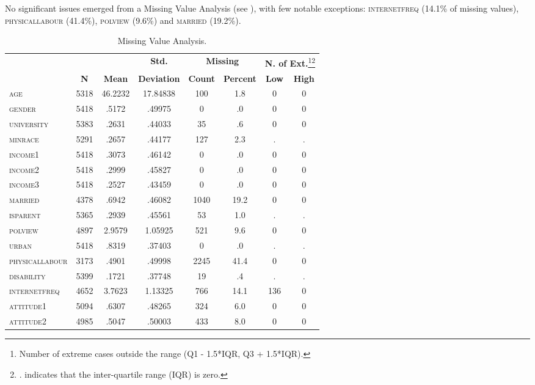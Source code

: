 No significant issues emerged from a Missing Value Analysis (see ),
with few notable exceptions\textsc{: internetfreq (}14.1\% of missing
values\textsc{), physicallabour (}41.4\%\textsc{), polview (}9.6\%\textsc{)}
and\textsc{ married (}19.2\%\textsc{). }
\begin{table}[h]
\centering{}%
\begin{minipage}[t]{1\columnwidth}%
\begin{center}
\renewcommand{\arraystretch}{1.5}%
\begin{tabular}{lccccccc}
\hline 
 &  &  & \textbf{Std. } & \multicolumn{2}{c}{\textbf{Missing}} & \multicolumn{2}{c}{\textbf{N. of Ext.}\footnote{Number of extreme cases outside the range (Q1 - 1.5{*}IQR, Q3 + 1.5{*}IQR). }\textbf{}\footnote{. indicates that the inter-quartile range (IQR) is zero.}}\tabularnewline
 & \textbf{N} & \textbf{Mean} & \textbf{Deviation} & \textbf{Count} & \textbf{Percent} & \textbf{Low} & \textbf{High}\tabularnewline
\hline 
\hline 
\textsc{age} & 5318 & 46.2232 & 17.84838 & 100 & 1.8 & 0 & 0\tabularnewline
\textsc{gender} & 5418 & .5172 & .49975 & 0 & .0 & 0 & 0\tabularnewline
\textsc{university} & 5383 & .2631 & .44033 & 35 & .6 & 0 & 0\tabularnewline
\textsc{minrace} & 5291 & .2657 & .44177 & 127 & 2.3 & . & .\tabularnewline
\textsc{income1} & 5418 & .3073 & .46142 & 0 & .0 & 0 & 0\tabularnewline
\textsc{income2} & 5418 & .2999 & .45827 & 0 & .0 & 0 & 0\tabularnewline
\textsc{income3} & 5418 & .2527 & .43459 & 0 & .0 & 0 & 0\tabularnewline
\textsc{married} & 4378 & .6942 & .46082 & 1040 & 19.2 & 0 & 0\tabularnewline
\textsc{isparent} & 5365 & .2939 & .45561 & 53 & 1.0 & . & .\tabularnewline
\textsc{polview} & 4897 & 2.9579 & 1.05925 & 521 & 9.6 & 0 & 0\tabularnewline
\textsc{urban} & 5418 & .8319 & .37403 & 0 & .0 & . & .\tabularnewline
\textsc{physicallabour} & 3173 & .4901 & .49998 & 2245 & 41.4 & 0 & 0\tabularnewline
\textsc{disability} & 5399 & .1721 & .37748 & 19 & .4 & . & .\tabularnewline
\textsc{internetfreq} & 4652 & 3.7623 & 1.13325 & 766 & 14.1 & 136 & 0\tabularnewline
\textsc{attitude1} & 5094 & .6307 & .48265 & 324 & 6.0 & 0 & 0\tabularnewline
\textsc{attitude2} & 4985 & .5047 & .50003 & 433 & 8.0 & 0 & 0\tabularnewline
\hline 
\end{tabular}\medskip{}
\par\end{center}
\begin{center}
\caption{Missing Value Analysis.\label{tab:Missing-Value-Analysis-Independ}}
\par\end{center}%
\end{minipage}
\end{table}
